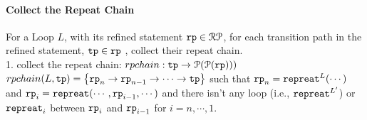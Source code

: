 \paragraph*{Collect the Repeat Chain}
For a Loop $L$, with its refined statement $\mathtt{rp} \in \mathcal{RP}$,
for each transition path in the refined statement, $\mathtt{tp} \in \mathtt{rp} $ , 
collect their repeat chain.
\\
1. collect the repeat chain: $rpchain : \mathtt{tp} \to \mathcal{P}(\mathcal{P}(\mathtt{rp})))$
\\
 $rpchain(L, \tpath) = \left \{ 
   \rprog_n \to \rprog_{n-1} \to \cdots \to \tpath \right \}$
 such that 
 $\mathtt{rp}_{n}= \mathtt{repreat}^{L}(\cdots)$ 
 and
 $\mathtt{rp}_{i}= \mathtt{repreat}(\cdots, \mathtt{rp}_{i - 1}, \cdots)$ and
 there isn't any loop (i.e., $\mathtt{repreat}^{L'}$) or $\mathtt{repreat}_i$ between $\mathtt{rp}_{i}$ and $\mathtt{rp}_{i - 1}$ for $i = n, \cdots, 1$.
